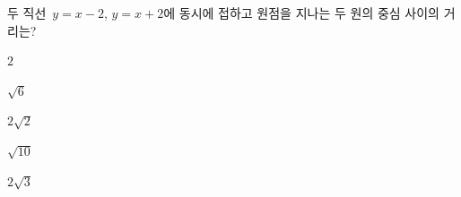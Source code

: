 두 직선~$y=x-2$, $y=x+2$에 동시에 접하고 원점을 지나는 두 원의 중심 사이의 거리는?
\begin{choices32}{\rule[-3ex]{0pt}{8ex}$2$}{\rule[-3ex]{0pt}{8ex}$\sqrt{6}$}{\rule[-3ex]{0pt}{8ex}$2\sqrt{2}$}{\rule[-3ex]{0pt}{8ex}$\sqrt{10}$}{\rule[-3ex]{0pt}{8ex}$2\sqrt{3}$}\end{choices32}
